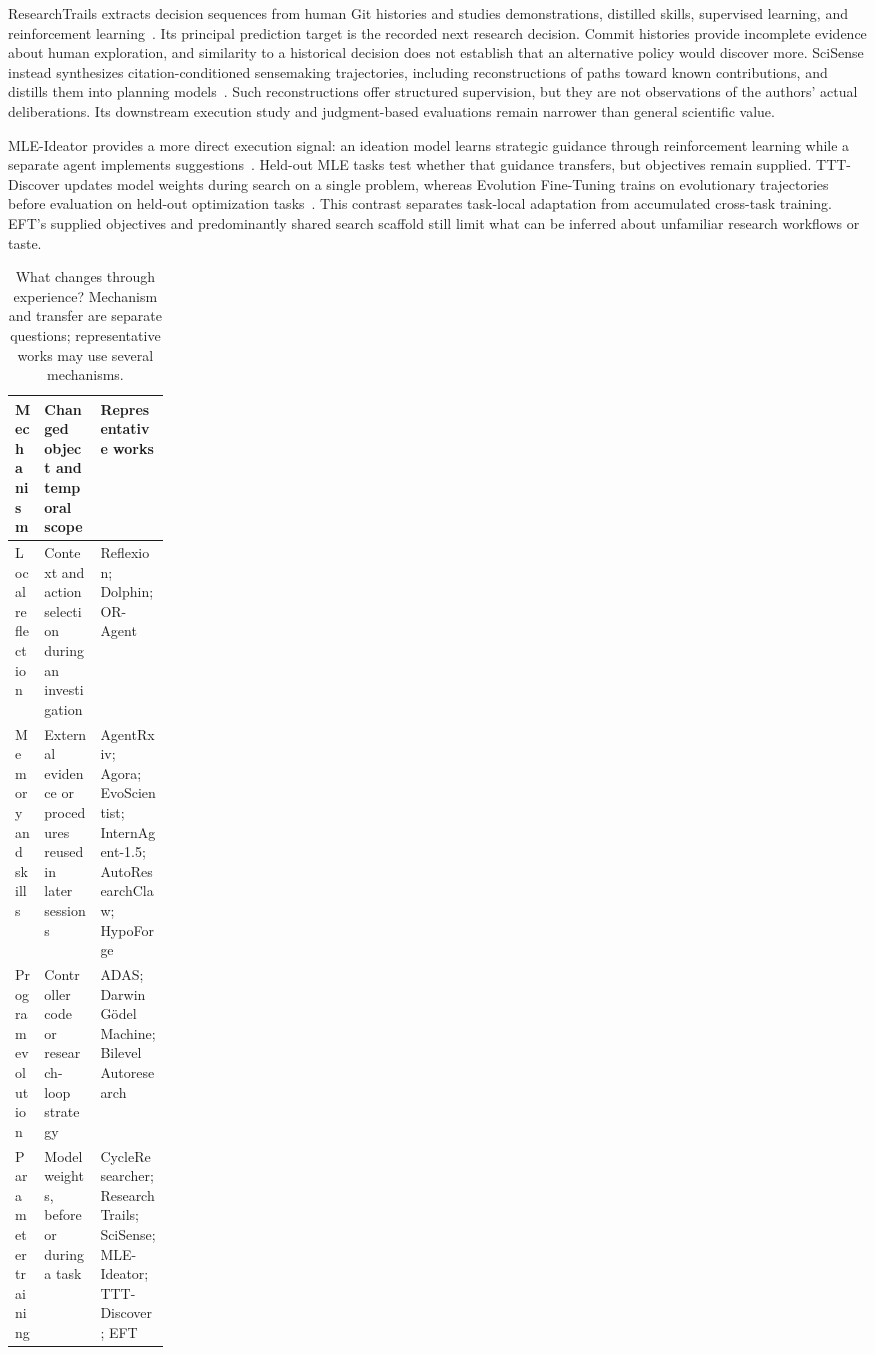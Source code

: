 ResearchTrails extracts decision sequences from human Git histories and studies demonstrations, distilled skills, supervised learning, and reinforcement learning~\cite{researchtrails}. Its principal prediction target is the recorded next research decision. Commit histories provide incomplete evidence about human exploration, and similarity to a historical decision does not establish that an alternative policy would discover more. SciSense instead synthesizes citation-conditioned sensemaking trajectories, including reconstructions of paths toward known contributions, and distills them into planning models~\cite{scisense}. Such reconstructions offer structured supervision, but they are not observations of the authors' actual deliberations. Its downstream execution study and judgment-based evaluations remain narrower than general scientific value.

MLE-Ideator provides a more direct execution signal: an ideation model learns strategic guidance through reinforcement learning while a separate agent implements suggestions~\cite{mle-ideator}. Held-out MLE tasks test whether that guidance transfers, but objectives remain supplied. TTT-Discover updates model weights during search on a single problem, whereas Evolution Fine-Tuning trains on evolutionary trajectories before evaluation on held-out optimization tasks~\cite{ttt-discover,evolution-fine-tuning}. This contrast separates task-local adaptation from accumulated cross-task training. EFT's supplied objectives and predominantly shared search scaffold still limit what can be inferred about unfamiliar research workflows or taste.

\begin{table}[tb]
\centering
\small
\caption{What changes through experience? Mechanism and transfer are separate questions; representative works may use several mechanisms.}
\label{tab:learning-mechanisms}
\begin{tabularx}{\linewidth}{@{}P{0.18\linewidth}YY@{}}
\toprule
Mechanism & Changed object and temporal scope & Representative works \\
\midrule
Local reflection & Context and action selection during an investigation & Reflexion; Dolphin; OR-Agent \\
Memory and skills & External evidence or procedures reused in later sessions & AgentRxiv; Agora; EvoScientist; InternAgent-1.5; AutoResearchClaw; HypoForge \\
Program evolution & Controller code or research-loop strategy & ADAS; Darwin G\"odel Machine; Bilevel Autoresearch \\
Parameter training & Model weights, before or during a task & CycleResearcher; ResearchTrails; SciSense; MLE-Ideator; TTT-Discover; EFT \\
\bottomrule
\end{tabularx}
\end{table}

